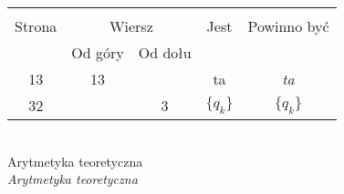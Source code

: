 \documentclass[a4paper,11pt]{article}
\begin{document}
\begin{center}
  \begin{tabular}{|c|c|c|c|c|}
    \hline
    & \multicolumn{2}{c|}{} & & \\
    Strona & \multicolumn{2}{c|}{Wiersz} & Jest
                              & Powinno być \\ \cline{2-3}
    & Od góry & Od dołu & & \\
    \hline
    13  & 13 & & ta & \emph{ta} \\
    32  & &  3 & $\boldsymbol{ \{ } q_{ k } \}$ & $\{ q_{ k } \}$ \\
    \hline
  \end{tabular}
\end{center}
\noi
{} \\
\Jest Arytmetyka teoretyczna \\
\Powin  \emph{Arytmetyka teoretyczna} \\

\vspace{\spaceTwo}





 {}




\end{document}

